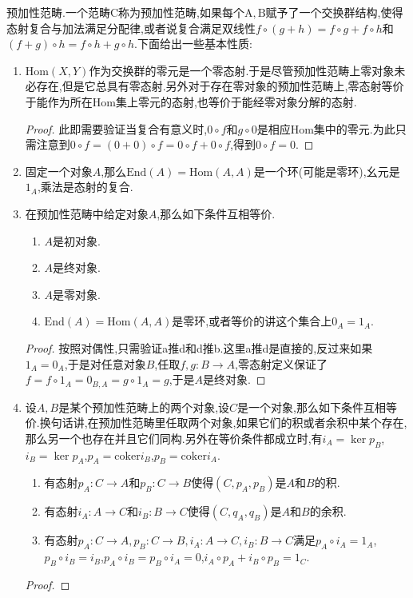 预加性范畴.一个范畴$\mathrm{C}$称为预加性范畴,如果每个$\mathrm{A,B}$赋予了一个交换群结构,使得态射复合与加法满足分配律,或者说复合满足双线性$f\circ(g+h)=f\circ g+f\circ h$和$(f+g)\circ h=f\circ h+g\circ h$.下面给出一些基本性质:
\begin{enumerate}
	\item $\mathrm{Hom}(X,Y)$作为交换群的零元是一个零态射.于是尽管预加性范畴上零对象未必存在,但是它总具有零态射.另外对于存在零对象的预加性范畴上,零态射等价于能作为所在Hom集上零元的态射,也等价于能经零对象分解的态射.
	\begin{proof}
		
		此即需要验证当复合有意义时,$0\circ f$和$g\circ0$是相应Hom集中的零元.为此只需注意到$0\circ f=(0+0)\circ f=0\circ f+0\circ f$,得到$0\circ f=0$.
	\end{proof}
	\item 固定一个对象$A$,那么$\mathrm{End}(A)=\mathrm{Hom}(A,A)$是一个环(可能是零环),幺元是$1_A$,乘法是态射的复合.
	\item 在预加性范畴中给定对象$A$,那么如下条件互相等价.
	\begin{enumerate}
		\item $A$是初对象.
		\item $A$是终对象.
		\item $A$是零对象.
		\item $\mathrm{End}(A)=\mathrm{Hom}(A,A)$是零环,或者等价的讲这个集合上$0_A=1_A$.
	\end{enumerate}
	\begin{proof}
		
		按照对偶性,只需验证a推d和d推b.这里a推d是直接的,反过来如果$1_A=0_A$,于是对任意对象$B$,任取$f,g:B\to A$,零态射定义保证了$f=f\circ1_A=0_{B,A}=g\circ1_A=g$,于是$A$是终对象.
	\end{proof}
	\item 设$A,B$是某个预加性范畴上的两个对象,设$C$是一个对象,那么如下条件互相等价.换句话讲,在预加性范畴里任取两个对象,如果它们的积或者余积中某个存在,那么另一个也存在并且它们同构.另外在等价条件都成立时,有$i_A=\ker p_B$,$i_B=\ker p_A$,$p_A=\mathrm{coker}i_B$,$p_B=\mathrm{coker}i_A$.
	\begin{enumerate}
		\item 有态射$p_A:C\to A$和$p_B:C\to B$使得$(C,p_A,p_B)$是$A$和$B$的积.
		\item 有态射$i_A:A\to C$和$i_B:B\to C$使得$(C,q_A,q_B)$是$A$和$B$的余积.
		\item 有态射$p_A:C\to A,p_B:C\to B,i_A:A\to C,i_B:B\to C$满足$p_A\circ i_A=1_A$,$p_B\circ i_B=i_B$,$p_A\circ i_B=p_B\circ i_A=0$,$i_A\circ p_A+i_B\circ p_B=1_C$.
	\end{enumerate}
	\begin{proof}
		

\end{proof}
\end{enumerate}
